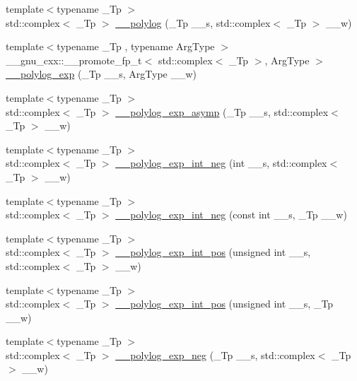 \begin{DoxyCompactItemize}
{\footnotesize template$<$typename \+\_\+\+Tp $>$ }\\std\+::complex$<$ \+\_\+\+Tp $>$ \hyperlink{namespacestd_1_1____detail_aa14e3ca6e4bee5ac1f1e5e1c2cee1d5a}{\+\_\+\+\_\+polylog} (\+\_\+\+Tp \+\_\+\+\_\+s, std\+::complex$<$ \+\_\+\+Tp $>$ \+\_\+\+\_\+w)
\item 
{\footnotesize template$<$typename \+\_\+\+Tp , typename Arg\+Type $>$ }\\\+\_\+\+\_\+gnu\+\_\+cxx\+::\+\_\+\+\_\+promote\+\_\+fp\+\_\+t$<$ std\+::complex$<$ \+\_\+\+Tp $>$, Arg\+Type $>$ \hyperlink{namespacestd_1_1____detail_a754c996ded0006978b76746d357a2d2d}{\+\_\+\+\_\+polylog\+\_\+exp} (\+\_\+\+Tp \+\_\+\+\_\+s, Arg\+Type \+\_\+\+\_\+w)
\item 
{\footnotesize template$<$typename \+\_\+\+Tp $>$ }\\std\+::complex$<$ \+\_\+\+Tp $>$ \hyperlink{namespacestd_1_1____detail_af3684fc449da490e9a43985245618a90}{\+\_\+\+\_\+polylog\+\_\+exp\+\_\+asymp} (\+\_\+\+Tp \+\_\+\+\_\+s, std\+::complex$<$ \+\_\+\+Tp $>$ \+\_\+\+\_\+w)
\item 
{\footnotesize template$<$typename \+\_\+\+Tp $>$ }\\std\+::complex$<$ \+\_\+\+Tp $>$ \hyperlink{namespacestd_1_1____detail_a0857fa498441a0b3a6bf9e2d91cb6e86}{\+\_\+\+\_\+polylog\+\_\+exp\+\_\+int\+\_\+neg} (int \+\_\+\+\_\+s, std\+::complex$<$ \+\_\+\+Tp $>$ \+\_\+\+\_\+w)
\item 
{\footnotesize template$<$typename \+\_\+\+Tp $>$ }\\std\+::complex$<$ \+\_\+\+Tp $>$ \hyperlink{namespacestd_1_1____detail_a7d1d29f2a53007e83c70e9ef805d0ffa}{\+\_\+\+\_\+polylog\+\_\+exp\+\_\+int\+\_\+neg} (const int \+\_\+\+\_\+s, \+\_\+\+Tp \+\_\+\+\_\+w)
\item 
{\footnotesize template$<$typename \+\_\+\+Tp $>$ }\\std\+::complex$<$ \+\_\+\+Tp $>$ \hyperlink{namespacestd_1_1____detail_ade6f4296cf73408cb7e4e3efa58610e2}{\+\_\+\+\_\+polylog\+\_\+exp\+\_\+int\+\_\+pos} (unsigned int \+\_\+\+\_\+s, std\+::complex$<$ \+\_\+\+Tp $>$ \+\_\+\+\_\+w)
\item 
{\footnotesize template$<$typename \+\_\+\+Tp $>$ }\\std\+::complex$<$ \+\_\+\+Tp $>$ \hyperlink{namespacestd_1_1____detail_a4915187dda5bbc8f089cfbbe6867f984}{\+\_\+\+\_\+polylog\+\_\+exp\+\_\+int\+\_\+pos} (unsigned int \+\_\+\+\_\+s, \+\_\+\+Tp \+\_\+\+\_\+w)
\item 
{\footnotesize template$<$typename \+\_\+\+Tp $>$ }\\std\+::complex$<$ \+\_\+\+Tp $>$ \hyperlink{namespacestd_1_1____detail_a07b26b8c7ff467310e4e1df6e3efd893}{\+\_\+\+\_\+polylog\+\_\+exp\+\_\+neg} (\+\_\+\+Tp \+\_\+\+\_\+s, std\+::complex$<$ \+\_\+\+Tp $>$ \+\_\+\+\_\+w)

\end{DoxyCompactItemize}
